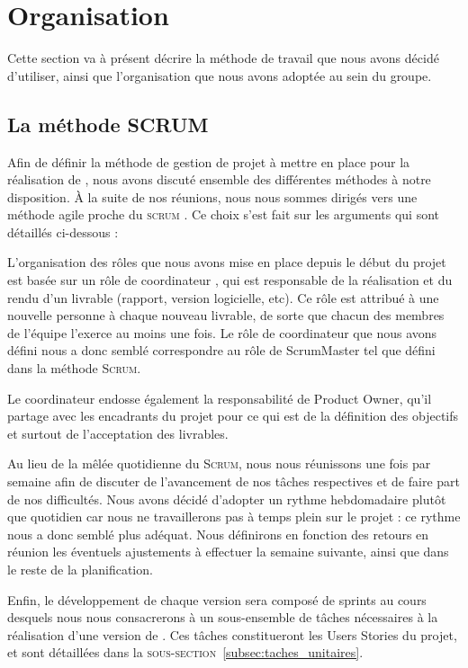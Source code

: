 \section{Organisation}
    \label{sec:orga}
    Cette section va à présent décrire la méthode de travail que nous avons décidé d'utiliser, ainsi que l'organisation que nous avons adoptée au sein du groupe.

    \subsection{La méthode SCRUM}
    \label{subsec:scrum}
        Afin de définir la méthode de gestion de projet à mettre en place pour la réalisation de \glasir{}, nous avons discuté ensemble des différentes méthodes à notre disposition. À la suite de nos réunions, nous nous sommes dirigés vers une méthode agile proche du \og \textsc{scrum} \fg{}. Ce choix s'est fait sur les arguments qui sont détaillés ci-dessous :

        L'organisation des rôles que nous avons mise en place depuis le début du projet est basée sur un rôle de \og coordinateur \fg{}, qui est responsable de la réalisation et du rendu d'un livrable (rapport, version logicielle, etc). Ce rôle est attribué à une nouvelle personne à chaque nouveau livrable, de sorte que chacun des membres de l'équipe l'exerce au moins une fois. Le rôle de coordinateur que nous avons défini nous a donc semblé correspondre au rôle de ScrumMaster tel que défini dans la méthode \textsc{Scrum}.

        Le coordinateur endosse également la responsabilité de Product Owner, qu'il partage avec les encadrants du projet pour ce qui est de la définition des objectifs et surtout de l'acceptation des livrables.

        Au lieu de la mêlée quotidienne du \textsc{Scrum}, nous nous réunissons une fois par semaine afin de discuter de l'avancement de nos tâches respectives et de faire part de nos difficultés. Nous avons décidé d'adopter un rythme hebdomadaire plutôt que quotidien car nous ne travaillerons pas à temps plein sur le projet : ce rythme nous a donc semblé plus adéquat. Nous définirons en fonction des retours en réunion les éventuels ajustements à effectuer la semaine suivante, ainsi que dans le reste de la planification.

        Enfin, le développement de chaque version sera composé de sprints au cours desquels nous nous consacrerons à un sous-ensemble de tâches nécessaires à la réalisation d'une version de \glasir{}. Ces tâches constitueront les Users Stories du projet, et sont détaillées dans la \textsc{sous-section}~\ref{subsec:taches_unitaires}.  
    
